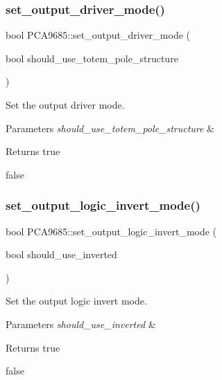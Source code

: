 \subsubsection{\texorpdfstring{set\+\_\+output\+\_\+driver\+\_\+mode()}{set\_output\_driver\_mode()}}
{\footnotesize\ttfamily bool P\+C\+A9685\+::set\+\_\+output\+\_\+driver\+\_\+mode (\begin{DoxyParamCaption}\item[{bool}]{should\+\_\+use\+\_\+totem\+\_\+pole\+\_\+structure }\end{DoxyParamCaption})}



Set the output driver mode. 


\begin{DoxyParams}{Parameters}
{\em should\+\_\+use\+\_\+totem\+\_\+pole\+\_\+structure} & \\
\hline
\end{DoxyParams}
\begin{DoxyReturn}{Returns}
true 

false 
\end{DoxyReturn}
\mbox{\label{class_p_c_a9685_a28f27604b1b28f3c25e45125318b9867}} 
\subsubsection{\texorpdfstring{set\+\_\+output\+\_\+logic\+\_\+invert\+\_\+mode()}{set\_output\_logic\_invert\_mode()}}
{\footnotesize\ttfamily bool P\+C\+A9685\+::set\+\_\+output\+\_\+logic\+\_\+invert\+\_\+mode (\begin{DoxyParamCaption}\item[{bool}]{should\+\_\+use\+\_\+inverted }\end{DoxyParamCaption})}



Set the output logic invert mode. 


\begin{DoxyParams}{Parameters}
{\em should\+\_\+use\+\_\+inverted} & \\
\hline
\end{DoxyParams}
\begin{DoxyReturn}{Returns}
true 

false 
\end{DoxyReturn}
\mbox{\label{class_p_c_a9685_a7743f9bd4a8a59d1ed4dd27498f25bf8}} 
